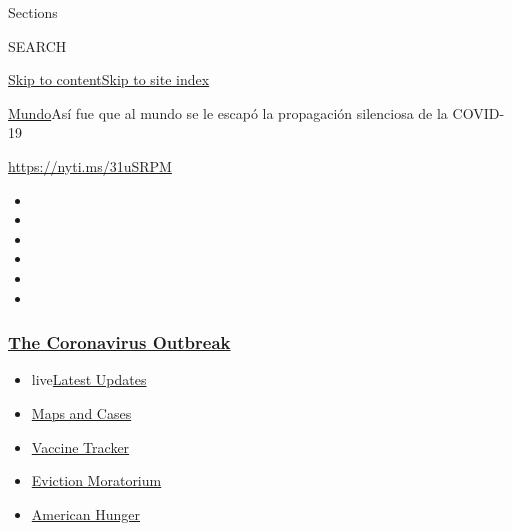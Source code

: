 Sections

SEARCH

\protect\hyperlink{site-content}{Skip to
content}\protect\hyperlink{site-index}{Skip to site index}

\href{/es/section/mundo}{Mundo}\textbar{}Así fue que al mundo se le
escapó la propagación silenciosa de la COVID-19

\url{https://nyti.ms/31uSRPM}

\begin{itemize}
\item
\item
\item
\item
\item
\item
\end{itemize}

\hypertarget{the-coronavirus-outbreak}{%
\subsubsection{\texorpdfstring{\href{https://www.nytimes3xbfgragh.onion/news-event/coronavirus?name=styln-coronavirus-national\&region=TOP_BANNER\&block=storyline_menu_recirc\&action=click\&pgtype=Article\&impression_id=0a23ee80-f1d0-11ea-a506-3174ba8d379e\&variant=undefined}{The
Coronavirus
Outbreak}}{The Coronavirus Outbreak}}\label{the-coronavirus-outbreak}}

\begin{itemize}
\tightlist
\item
  live\href{https://www.nytimes3xbfgragh.onion/2020/09/08/world/covid-19-coronavirus.html?name=styln-coronavirus-national\&region=TOP_BANNER\&block=storyline_menu_recirc\&action=click\&pgtype=Article\&impression_id=0a241590-f1d0-11ea-a506-3174ba8d379e\&variant=undefined}{Latest
  Updates}
\item
  \href{https://www.nytimes3xbfgragh.onion/interactive/2020/us/coronavirus-us-cases.html?name=styln-coronavirus-national\&region=TOP_BANNER\&block=storyline_menu_recirc\&action=click\&pgtype=Article\&impression_id=0a241591-f1d0-11ea-a506-3174ba8d379e\&variant=undefined}{Maps
  and Cases}
\item
  \href{https://www.nytimes3xbfgragh.onion/interactive/2020/science/coronavirus-vaccine-tracker.html?name=styln-coronavirus-national\&region=TOP_BANNER\&block=storyline_menu_recirc\&action=click\&pgtype=Article\&impression_id=0a241592-f1d0-11ea-a506-3174ba8d379e\&variant=undefined}{Vaccine
  Tracker}
\item
  \href{https://www.nytimes3xbfgragh.onion/2020/09/02/your-money/eviction-moratorium-covid.html?name=styln-coronavirus-national\&region=TOP_BANNER\&block=storyline_menu_recirc\&action=click\&pgtype=Article\&impression_id=0a241593-f1d0-11ea-a506-3174ba8d379e\&variant=undefined}{Eviction
  Moratorium}
\item
  \href{https://www.nytimes3xbfgragh.onion/interactive/2020/09/02/magazine/food-insecurity-hunger-us.html?name=styln-coronavirus-national\&region=TOP_BANNER\&block=storyline_menu_recirc\&action=click\&pgtype=Article\&impression_id=0a241594-f1d0-11ea-a506-3174ba8d379e\&variant=undefined}{American
  Hunger}
\end{itemize}

